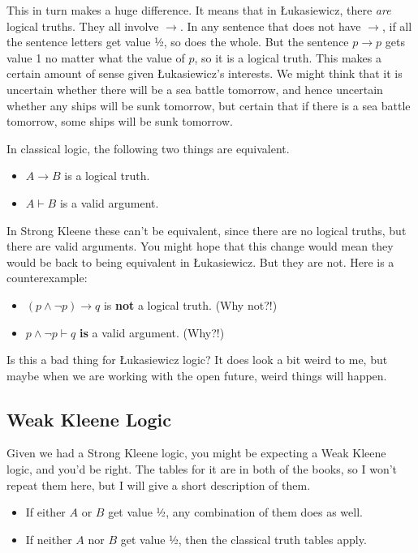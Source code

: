 \documentclass[
]{article}
\providecommand{\tightlist}{%
  \setlength{\itemsep}{0pt}\setlength{\parskip}{0pt}}\usepackage{longtable,booktabs,array}
\begin{document}
This in turn makes a huge difference. It means that in Łukasiewicz,
there \emph{are} logical truths. They all involve \(\rightarrow\). In
any sentence that does not have \(\rightarrow\), if all the sentence
letters get value ½, so does the whole. But the sentence
\(p \rightarrow p\) gets value 1 no matter what the value of \(p\), so
it is a logical truth. This makes a certain amount of sense given
Łukasiewicz's interests. We might think that it is uncertain whether
there will be a sea battle tomorrow, and hence uncertain whether any
ships will be sunk tomorrow, but certain that if there is a sea battle
tomorrow, some ships will be sunk tomorrow.

In classical logic, the following two things are equivalent.

\begin{itemize}
\tightlist
\item
  \(A \rightarrow B\) is a logical truth.
\item
  \(A \vdash B\) is a valid argument.
\end{itemize}

In Strong Kleene these can't be equivalent, since there are no logical
truths, but there are valid arguments. You might hope that this change
would mean they would be back to being equivalent in Łukasiewicz. But
they are not. Here is a counterexample:

\begin{itemize}
\tightlist
\item
  \((p \wedge \neg p) \rightarrow q\) is \textbf{not} a logical truth.
  (Why not?!)
\item
  \(p \wedge \neg p \vdash q\) \textbf{is} a valid argument. (Why?!)
\end{itemize}

Is this a bad thing for Łukasiewicz logic? It does look a bit weird to
me, but maybe when we are working with the open future, weird things
will happen.

\hypertarget{weak-kleene-logic}{%
\subsection{Weak Kleene Logic}\label{weak-kleene-logic}}

Given we had a Strong Kleene logic, you might be expecting a Weak Kleene
logic, and you'd be right. The tables for it are in both of the books,
so I won't repeat them here, but I will give a short description of
them.

\begin{itemize}
\tightlist
\item
  If either \(A\) or \(B\) get value ½, any combination of them does as
  well.
\item
  If neither \(A\) nor \(B\) get value ½, then the classical truth
  tables apply.
\end{itemize}
\end{document}
